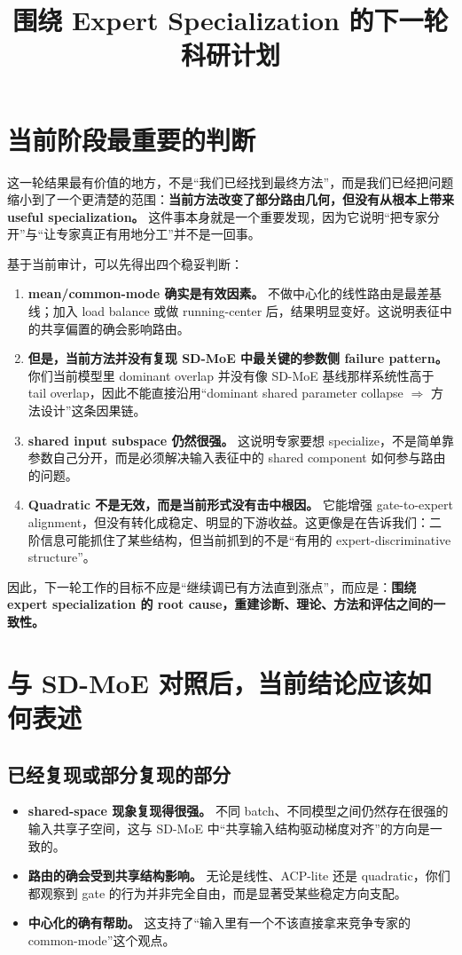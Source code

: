 \documentclass[11pt]{article}
\title{围绕 Expert Specialization 的下一轮科研计划}
\author{}
\date{}
\begin{document}
\maketitle

\section{当前阶段最重要的判断}

这一轮结果最有价值的地方，不是“我们已经找到最终方法”，而是我们已经把问题缩小到了一个更清楚的范围：\textbf{当前方法改变了部分路由几何，但没有从根本上带来 useful specialization。} 这件事本身就是一个重要发现，因为它说明“把专家分开”与“让专家真正有用地分工”并不是一回事。

基于当前审计，可以先得出四个稳妥判断：
\begin{enumerate}
    \item \textbf{mean/common-mode 确实是有效因素。} 不做中心化的线性路由是最差基线；加入 load balance 或做 running-center 后，结果明显变好。这说明表征中的共享偏置的确会影响路由。
    \item \textbf{但是，当前方法并没有复现 SD-MoE 中最关键的参数侧 failure pattern。} 你们当前模型里 dominant overlap 并没有像 SD-MoE 基线那样系统性高于 tail overlap，因此不能直接沿用“dominant shared parameter collapse $\Rightarrow$ 方法设计”这条因果链。
    \item \textbf{shared input subspace 仍然很强。} 这说明专家要想 specialize，不是简单靠参数自己分开，而是必须解决输入表征中的 shared component 如何参与路由的问题。
    \item \textbf{Quadratic 不是无效，而是当前形式没有击中根因。} 它能增强 gate-to-expert alignment，但没有转化成稳定、明显的下游收益。这更像是在告诉我们：二阶信息可能抓住了某些结构，但当前抓到的不是“有用的 expert-discriminative structure”。
\end{enumerate}

因此，下一轮工作的目标不应是“继续调已有方法直到涨点”，而应是：\textbf{围绕 expert specialization 的 root cause，重建诊断、理论、方法和评估之间的一致性。}

\section{与 SD-MoE 对照后，当前结论应该如何表述}

\subsection{已经复现或部分复现的部分}
\begin{itemize}
    \item \textbf{shared-space 现象复现得很强。} 不同 batch、不同模型之间仍然存在很强的输入共享子空间，这与 SD-MoE 中“共享输入结构驱动梯度对齐”的方向是一致的。
    \item \textbf{路由的确会受到共享结构影响。} 无论是线性、ACP-lite 还是 quadratic，你们都观察到 gate 的行为并非完全自由，而是显著受某些稳定方向支配。
    \item \textbf{中心化的确有帮助。} 这支持了“输入里有一个不该直接拿来竞争专家的 common-mode”这个观点。
\end{itemize}
\end{document}
